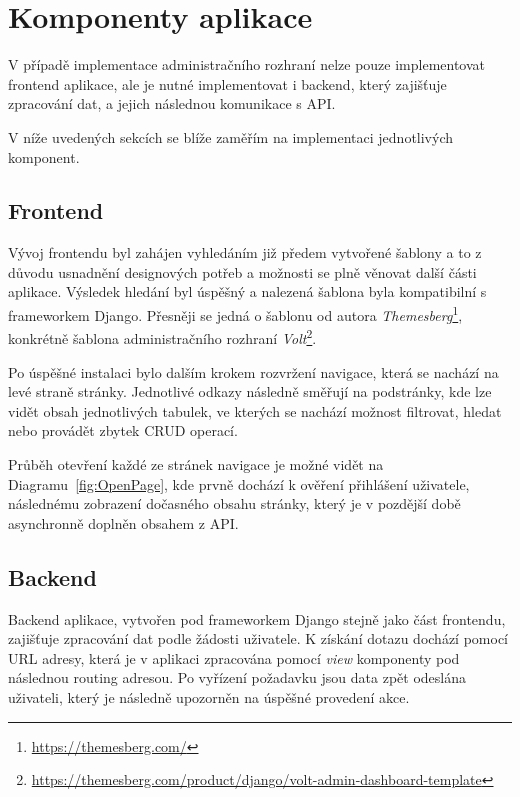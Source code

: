\section{Komponenty aplikace}
\label{sec:implementation-components}
V případě implementace administračního rozhraní nelze pouze implementovat frontend aplikace, ale je nutné implementovat i backend, který zajišťuje zpracování dat, a jejich následnou komunikace s API\@.

V níže uvedených sekcích se blíže zaměřím na implementaci jednotlivých komponent.

\subsection{Frontend}
\label{subsec:implementation-frontend}
Vývoj frontendu byl zahájen vyhledáním již předem vytvořené šablony a to z důvodu usnadnění designových potřeb a možnosti se plně věnovat další části aplikace. Výsledek hledání byl úspěšný a nalezená šablona byla kompatibilní s frameworkem Django. Přesněji se jedná o šablonu od autora \textit{Themesberg}\footnote{\href{https://themesberg.com/}{https://themesberg.com/}}, konkrétně šablona administračního rozhraní \textit{Volt}\footnote{\href{https://themesberg.com/product/django/volt-admin-dashboard-template}{https://themesberg.com/product/django/volt-admin-dashboard-template}}.

Po úspěšné instalaci bylo dalším krokem rozvržení navigace, která se nachází na levé straně stránky. Jednotlivé odkazy následně směřují na podstránky, kde lze vidět obsah jednotlivých tabulek, ve kterých se nachází možnost filtrovat, hledat nebo provádět zbytek CRUD operací.

Průběh otevření každé ze stránek navigace je možné vidět na Diagramu~\ref{fig:OpenPage}, kde prvně dochází k ověření přihlášení uživatele, následnému zobrazení dočasného obsahu stránky, který je v pozdější době asynchronně doplněn obsahem z API\@.


\subsection{Backend}
\label{subsec:implementation-backend}
Backend aplikace, vytvořen pod frameworkem Django stejně jako část frontendu, zajišťuje zpracování dat podle žádosti uživatele. K získání dotazu dochází pomocí URL adresy, která je v aplikaci zpracována pomocí \textit{view} komponenty pod následnou routing adresou. Po vyřízení požadavku jsou data zpět odeslána uživateli, který je následně upozorněn na úspěšné provedení akce.

